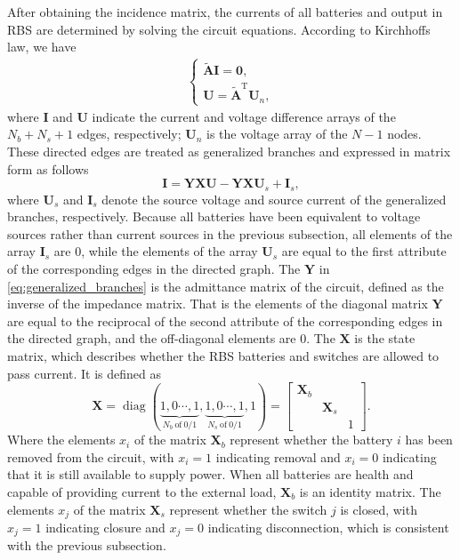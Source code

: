 \documentclass{article}
\DeclareMathOperator{\diag}{diag}
\def\T{\mathrm{T}}
\begin{document}
After obtaining the incidence matrix, the currents of all batteries and output in RBS are determined by solving the circuit equations.
According to Kirchhoffs law, we have
\begin{align}\label{eq:Kirchhoffs_law}
    \begin{cases}
        \bm{\tilde{A}} \bm{I} = \bm{0}, \\
        \bm{U}        = \bm{\tilde{A}}^\T \bm{U}_n,
    \end{cases}
\end{align}
where $\bm{I}$ and $\bm{U}$ indicate the current and voltage difference arrays of the $N_b+N_s+1$ edges, respectively;
$\bm{U}_n$ is the voltage array of the $N-1$ nodes.
These directed edges are treated as generalized branches and expressed in matrix form as follows
\begin{equation}\label{eq:generalized_branches}
    \bm{I} = \bm{Y}\bm{X} \bm{U} - \bm{Y}\bm{X} \bm{U}_s +\bm{I}_s,
\end{equation}
where $\bm{U}_s$ and $\bm{I}_s$ denote the source voltage and source current of the generalized branches, respectively.
Because all batteries have been equivalent to voltage sources rather than current sources in the previous subsection, all elements of the array $\bm{I}_s$ are 0, 
while the elements of the array $\bm{U}_s$ are equal to the first attribute of the corresponding edges in the directed graph.
The $\bm{Y}$ in \ref{eq:generalized_branches} is the admittance matrix of the circuit, defined as the inverse of the impedance matrix.
That is the elements of the diagonal matrix $\bm{Y}$ are equal to the reciprocal of the second attribute of the corresponding edges in the directed graph, and the off-diagonal elements are 0.
The $\bm{X}$ is the state matrix, which describes whether the RBS batteries and switches are allowed to pass current.
It is defined as
\begin{equation}\label{eq:X}
    \bm{X} = \diag(
    \underbrace{1, 0 \cdots, 1}_{N_b~\text{of}~0/1},
    \underbrace{1, 0 \cdots, 1}_{N_s~\text{of}~0/1},
    1)
    =\begin{bmatrix}
        \bm{X}_b & & \\
        & \bm{X}_s &\\
        & & 1
    \end{bmatrix}.
\end{equation}
Where the elements $x_i$ of the matrix $\bm{X}_b$ represent whether the battery $i$ has been removed from the circuit, with $x_i=1$ indicating removal and $x_i=0$ indicating that it is still available to supply power. 
When all batteries are health and capable of providing current to the external load, $\bm{X}_b$ is an identity matrix. 
The elements $x_j$ of the matrix $\bm{X}_s$ represent whether the switch $j$ is closed, with $x_j=1$ indicating closure and $x_j=0$ indicating disconnection, which is consistent with the previous subsection.
\end{document}
